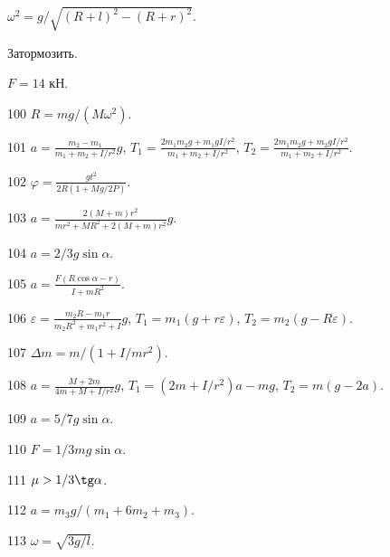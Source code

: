 \begin{Answer}{97}
$\omega^2 = g/\sqrt{(R+l)^2-(R+r)^2}$.
\end{Answer}
\begin{Answer}{98}
Затормозить.
\end{Answer}
\begin{Answer}{99}
$F = 14$ кН.
\end{Answer}
\begin{Answer}{100}
$R = mg/(M\omega^2)$.
\end{Answer}
\begin{Answer}{101}
$a= \frac{m_2-m_1}{m_1+m_2+I/r^2}g$, $T_1 = \frac{2m_1m_2g + m_1gI/r^2}{m_1+m_2+I/r^2}$, $T_2 = \frac{2m_1m_2g + m_2gI/r^2}{m_1+m_2+I/r^2}$.
\end{Answer}
\begin{Answer}{102}
$\varphi = \frac{gt^2}{2R(1+Mg/2P)}$.
\end{Answer}
\begin{Answer}{103}
$a = \frac{2(M+m)r^2}{mr^2+MR^2+2(M+m)r^2}g$.
\end{Answer}
\begin{Answer}{104}
$a=2/3g\sin \alpha$.
\end{Answer}
\begin{Answer}{105}
$a = \frac{F(R\cos \alpha - r)}{I + mR^2}$.
\end{Answer}
\begin{Answer}{106}
$\varepsilon = \frac{m_2R - m_1r}{m_2R^2 + m_1r^2 + I}g$, $T_1 = m_1(g+r\varepsilon)$, $T_2 = m_2(g-R\varepsilon)$.
\end{Answer}
\begin{Answer}{107}
$\Delta m = m/(1+I/mr^2)$.
\end{Answer}
\begin{Answer}{108}
$a = \frac{M+2m}{4m+M+I/r^2}g$, $T_1 = (2m+I/r^2)a - mg$, $T_2=m(g-2a)$.
\end{Answer}
\begin{Answer}{109}
$a=5/7g\sin \alpha$.
\end{Answer}
\begin{Answer}{110}
$F = 1/3 mg \sin \alpha$.
\end{Answer}
\begin{Answer}{111}
$\mu > 1/3 \tg \alpha$.
\end{Answer}
\begin{Answer}{112}
$a = m_3g/(m_1 + 6m_2 +m_3)$.
\end{Answer}
\begin{Answer}{113}
$\omega = \sqrt{3g/l}$.
\end{Answer}
